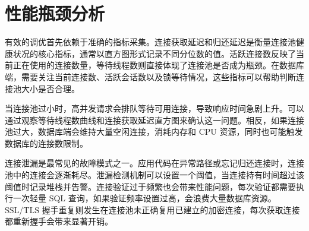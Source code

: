 \chapter{性能瓶颈分析}
有效的调优首先依赖于准确的指标采集。连接获取延迟和归还延迟是衡量连接池健康状况的核心指标，通常以直方图形式记录不同分位数的值。活跃连接数反映了当前正在使用的连接数量，等待线程数则直接体现了连接池是否成为瓶颈。在数据库端，需要关注当前连接数、活跃会话数以及锁等待情况，这些指标可以帮助判断连接池大小是否合理。\par
当连接池过小时，高并发请求会排队等待可用连接，导致响应时间急剧上升。可以通过观察等待线程数曲线和连接获取延迟直方图来确认这一问题。相反，如果连接池过大，数据库端会维持大量空闲连接，消耗内存和 CPU 资源，同时也可能触发数据库的连接数限制。\par
连接泄漏是最常见的故障模式之一。应用代码在异常路径或忘记归还连接时，连接池中的连接会逐渐耗尽。泄漏检测机制可以设置一个阈值，当连接持有时间超过该阈值时记录堆栈并告警。连接验证过于频繁也会带来性能问题，每次验证都需要执行一次轻量 SQL 查询，如果验证频率设置过高，会浪费大量数据库资源。SSL/TLS 握手重复则发生在连接池未正确复用已建立的加密连接，每次获取连接都重新握手会带来显著开销。\par
